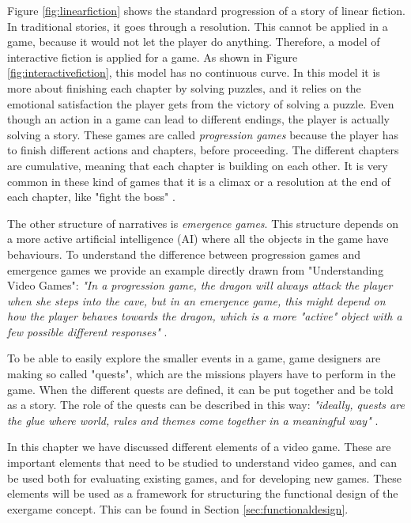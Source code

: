 Figure \ref{fig:linearfiction} shows the standard progression of a story of linear fiction. In traditional stories, it goes through a resolution. This cannot be applied in a game, because it would not let the player do anything. Therefore, a model of interactive fiction is applied for a game. As shown in Figure \ref{fig:interactivefiction}, this model has no continuous curve. In this model it is more about finishing each chapter by solving puzzles, and it relies on the emotional satisfaction the player gets from the victory of solving a puzzle. Even though an action in a game can lead to different endings, the player is actually solving a story. These games are called \emph{progression games} because the player has to finish different actions and chapters, before proceeding. The different chapters are cumulative, meaning that each chapter is building on each other. It is very common in these kind of games that it is a climax or a resolution at the end of each chapter, like "fight the boss" \cite{understandingvg}. 

The other structure of narratives is \emph{emergence games}. This structure depends on a more active artificial intelligence (AI) where all the objects in the game have behaviours. To understand the difference between progression games and emergence games we provide an example directly drawn from "Understanding Video Games": \emph{"In a progression game, the dragon will always attack the player when she steps into the cave, but in an emergence game, this might depend on how the player behaves towards the dragon, which is a more "active" object with a few possible different responses"} \cite{understandingvg}.

To be able to easily explore the smaller events in a game, game designers are making so called "quests", which are the missions players have to perform in the game. When the different quests are defined, it can be put together and be told as a story. The role of the quests can be described in this way: \emph{"ideally, quests are the glue where world, rules and themes come together in a meaningful way"} \cite{understandingvg}.

In this chapter we have discussed different elements of a video game. These are important elements that need to be studied to understand video games, and can be used both for evaluating existing games, and for developing new games. These elements will be used as a framework for structuring the functional design of the exergame concept. This can be found in Section \ref{sec:functionaldesign}.

